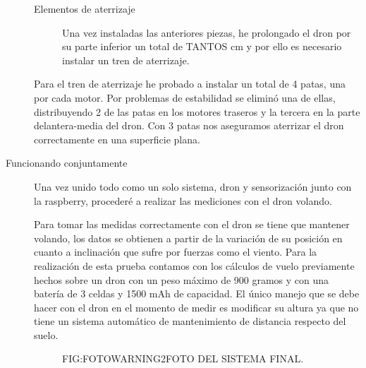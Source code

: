 \begin{description}
\begin{description}
\item[Elementos de aterrizaje]

Una vez instaladas las anteriores piezas, he prolongado el dron por su parte inferior un total de TANTOS cm y por ello es necesario instalar un tren de aterrizaje.

\end{description}

Para el tren de aterrizaje he probado a instalar un total de 4 patas, una por cada motor. Por problemas de estabilidad se eliminó una de ellas, distribuyendo 2 de las patas en los motores traseros y la tercera en la parte delantera-media del dron. Con 3 patas nos aseguramos aterrizar el dron correctamente en una superficie plana.

\item[Funcionando conjuntamente]

Una vez unido todo como un solo sistema, dron y sensorización junto con la raspberry, procederé a realizar las mediciones con el dron volando.

Para tomar las medidas correctamente con el dron se tiene que mantener volando, los datos se obtienen a partir de la variación de su posición en cuanto a inclinación que sufre por fuerzas como el viento.
Para la realización de esta prueba contamos con los cálculos de vuelo previamente hechos sobre un dron con un peso máximo de 900 gramos y con una batería de 3 celdas y 1500 mAh de capacidad. El único manejo que se debe hacer con el dron en el momento de medir es modificar su altura ya que no tiene un sistema automático de mantenimiento de distancia respecto del suelo.

  \begin{figure}[Foto del dron con sensorización de viento]{FIG:FOTOWARNING2}{FOTO DEL SISTEMA FINAL.}
\end{figure}


\end{description}


